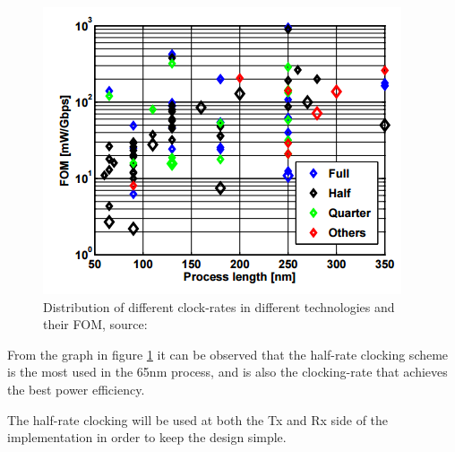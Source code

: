 \begin{figure}[ht!]
\begin{center}
\includegraphics[scale=1.2]{img/clock1}
\caption{Distribution of different clock-rates in different technologies and their FOM, source: ~\cite{rajesh2011a}}
\label{fig:graph1}
\end{center}
\end{figure}

From the graph in figure \ref{fig:graph1} it can be observed that the half-rate clocking scheme is the most used in the 65nm process, and is also the clocking-rate that achieves the best power efficiency.

The half-rate clocking will be used at both the Tx and Rx side of the implementation in order to keep the design simple.